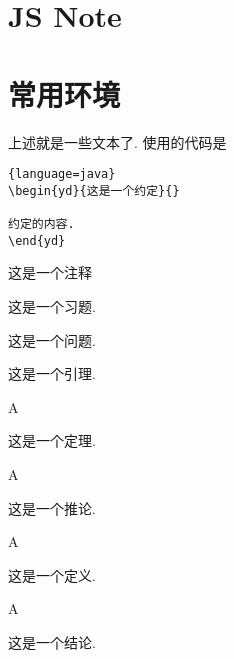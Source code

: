 \documentclass[a4,10pt]{ctexart}
\begin{document}
\section{JS Note}

\section{常用环境}


上述就是一些文本了. 使用的代码是
\begin{lstlisting}{language=java}
\begin{yd}{这是一个约定}{}
              
约定的内容.
\end{yd}
\end{lstlisting}

\begin{zs}
        
这是一个注释
    
\end{zs}
    
\begin{xt}
        
这是一个习题.
    
\end{xt}
    
\begin{lt}
        
这是一个问题.
    
\end{lt}

\begin{yl}
        
这是一个引理.
    
\end{yl}

\begin{dl}{A}{}
        
这是一个定理.
    
\end{dl}
    
\begin{tl}{A}{}
        
这是一个推论.
    
\end{tl}

\begin{dy}{A}{}
        
这是一个定义.
    
\end{dy}

\begin{jl}{A}{}
        
这是一个结论.
    
\end{jl}
\end{document}

